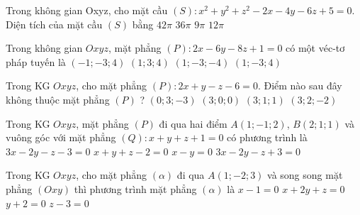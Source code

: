 \begin{ex}%
Trong không gian Oxyz, cho mặt cầu $(S): x^{2}+y^{2}+z^{2}-2 x-4 y-6 z+5=0$. Diện tích của mặt cầu $(S)$ bằng
\choice
{$42 \pi$}
{\True $36 \pi$}
{$9 \pi$}
{$12 \pi$}
\end{ex}

\begin{ex}%
Trong không gian $O x y z$, mặt phẳng $(P): 2 x-6 y-8 z+1=0$ có một véc-tơ pháp tuyến là
\choice
{$(-1 ;-3 ; 4)$}
{$(1 ; 3 ; 4)$}
{\True $(1 ;-3 ;-4)$}
{$(1 ;-3 ; 4)$}
\end{ex}

\begin{ex}%
Trong KG $Oxyz$, cho mặt phẳng $(P)\colon 2 x+y-z-6=0$. Điểm nào sau đây không thuộc mặt phẳng $(P)$ ?
\choice
{$(0 ; 3 ;-3)$}
{$(3 ; 0 ; 0)$}
{$(3 ; 1 ; 1)$}
{\True $(3 ; 2 ;-2)$}
\end{ex}

\begin{ex}%
Trong KG $Oxyz$, mặt phẳng $(P)$ đi qua hai điểm $A(1;-1;2)$, $B(2;1;1)$ và vuông góc với mặt phẳng $(Q)\colon x+y+z+1=0$ có phương trình là
\choice
{\True $3x-2y-z-3=0$}
{$x+y+z-2=0$}
{$x-y=0$}
{$3x-2y-z+3=0$}
\end{ex}

\begin{ex}%
Trong KG $Oxyz$, cho mặt phẳng $(\alpha)$ đi qua $A(1;-2;3)$ và song song mặt phẳng $(Oxy)$ thì phương trình mặt phẳng $(\alpha)$ là
\choice
{$x-1=0$}
{$x+2y+z=0$}
{$y+2=0$}
{\True $z-3=0$}
\end{ex}

